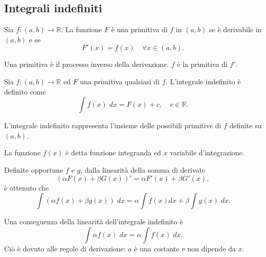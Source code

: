 \subsection{Integrali indefiniti}
\begin{definition}[Primitiva]
    Sia $f\colon (a,b)\rightarrow\mathbb R$. La funzione $F$ è una primitiva di $f$ in $(a,b)$ se è derivabile in $(a,b)$ e se
    \begin{equation*}
        F'(x)=f(x)\quad\forall x\in(a,b).
    \end{equation*}
\end{definition}

\begin{remark}
    Una primitiva è il processo inverso della derivazione. $f$ è la primitiva di $f'$.
\end{remark}

\begin{definition}
    Sia $f\colon (a,b)\rightarrow\mathbb R$ ed $F$ una primitiva qualsiasi di $f$. L'integrale indefinito è definito come
    \begin{equation*}
        \int f(x) \; dx=F(x)+c,\quad c\in\mathbb R.
    \end{equation*}
\end{definition}

L'integrale indefinito rappresenta l'insieme delle possibili primitive di $f$ definite su $(a,b)$.

La funzione $f(x)$ è detta funzione integranda ed $x$ variabile d'integrazione.

\begin{property}
    Definite opportune $f$ e $g$, dalla linearità della somma di derivate 
    \begin{equation*}
        (\alpha F(x)+\beta G(x))'=\alpha F'(x)+\beta G'(x),
    \end{equation*}
    è ottenuto che
    \begin{equation*}
        \int(\alpha f(x)+\beta g(x)) \; dx = \alpha \int f(x)dx +\beta \int g(x) \; dx.
    \end{equation*}
\end{property}

\begin{remark}
    Una conseguenza della linearità dell'integrale indefinito è
    \begin{equation*}
        \int\alpha f(x) \; dx = \alpha\int f(x) \; dx.
    \end{equation*}
    Ciò è dovuto alle regole di derivazione: $a$ è una costante e non dipende da $x$.
\end{remark}

